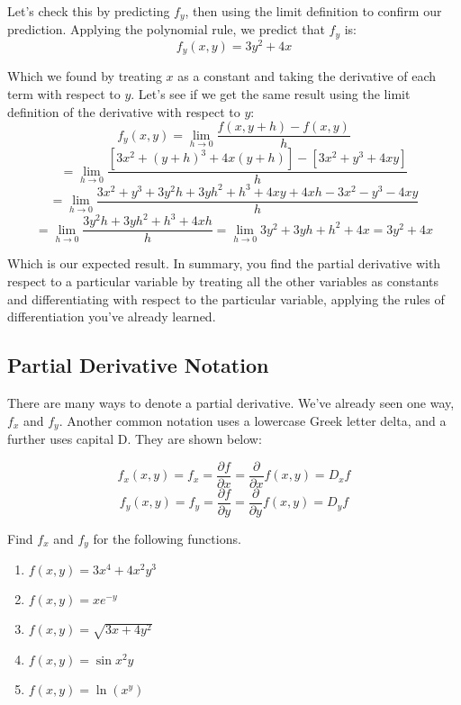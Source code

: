 Let's check this by predicting $f_y$, then using the limit definition to 
confirm our prediction. Applying the polynomial rule, we predict that $f_y$ is:
$$f_y(x, y) = 3y^2 + 4x$$

Which we found by treating $x$ as a constant and taking the derivative of each 
term with respect to $y$. Let's see if we get the same result using the limit 
definition of the derivative with respect to $y$:
$$f_y(x, y) = \lim_{h \to 0} \frac{f(x, y + h) - f(x, y)}{h}$$
$$= \lim_{h \to 0} \frac{\left[3x^2 + \left(y + h \right)^3 + 4x \left(y + h 
\right) \right] - \left[ 3x^2 + y^3 + 4xy \right]}{h}$$
$$= \lim_{h \to 0} \frac{3x^2 + y^3 + 3y^2h + 3yh^2 + h^3 + 4xy + 4xh - 3x^2 - 
y^3 - 4xy}{h}$$
$$= \lim_{h \to 0} \frac{3y^2h + 3yh^2 + h^3 + 4xh}{h} = \lim_{h \to 0} 3y^2 + 
3yh + h^2 + 4x = 3y^2 + 4x$$

Which is our expected result. In summary, you find the partial derivative with 
respect to a particular variable by treating all the other variables as 
constants and differentiating with respect to the particular variable, applying
the rules of differentiation you've already learned. 

\subsection{Partial Derivative Notation}
There are many ways to denote a partial derivative. We've already seen one way,
$f_x$ and $f_y$. Another common notation uses a lowercase Greek letter delta, 
and a further uses capital D. They are shown below:

\begin{mdframed}[style = important, frametitle = {Partial Derivative Notations}]
$$f_x(x, y) = f_x = \frac{\partial f}{\partial x} = \frac{\partial}{\partial x}
f(x, y) = D_x f$$
$$f_y(x, y) = f_y = \frac{\partial f}{\partial y} = \frac{\partial}{\partial y}
f(x, y) = D_y f$$
\end{mdframed}

\begin{Exercise}[title = {First Partial Derivatives}, label = first]
Find $f_x$ and $f_y$ for the following functions.
\begin{enumerate}
\item $f(x, y) = 3x^4 + 4x^2y^3$
\item $f(x, y) = xe^{-y}$
\item $f(x, y) = \sqrt{3x + 4y^2}$
\item $f(x, y) = \sin{x^2y}$
\item $f(x, y) = \ln{ \left(x^y \right)}$
\end{enumerate}
\vspace{50mm}
\end{Exercise}

